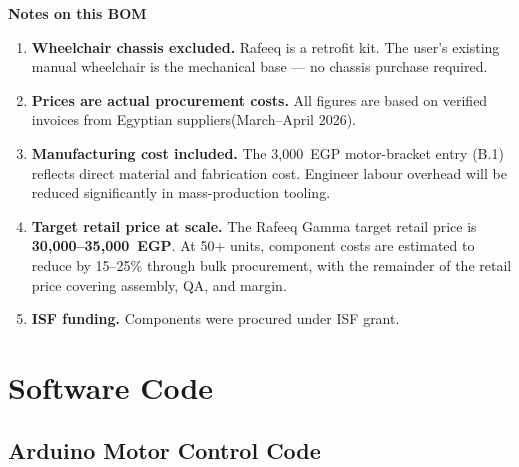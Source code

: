 \documentclass[12pt,a4paper]{report}
\begin{document}
\begin{mdframed}[
  backgroundcolor=NoteBg,
  linecolor=NoteFrame,
  linewidth=1.5pt,
  leftline=true,
  rightline=false,
  topline=false,
  bottomline=false,
  innerleftmargin=12pt,
  innerrightmargin=10pt,
  innertopmargin=8pt,
  innerbottommargin=8pt
]
{\bfseries\color{RafeeqBlue} Notes on this BOM}

\begin{enumerate}[leftmargin=*, itemsep=4pt, topsep=4pt]

  \item \textbf{Wheelchair chassis excluded.}
        Rafeeq is a retrofit kit. The user's existing manual
        wheelchair is the mechanical base — no chassis purchase
        required.

  \item \textbf{Prices are actual procurement costs.}
        All figures are based on verified invoices from Egyptian
        suppliers(March--April 2026).

  \item \textbf{Manufacturing cost included.}
        The 3{,}000~EGP motor-bracket entry (B.1) reflects
        direct material and fabrication cost. Engineer labour
        overhead will be reduced significantly in mass-production
        tooling.

  \item \textbf{Target retail price at scale.}
        The Rafeeq Gamma target retail price is
        \textbf{30{,}000--35{,}000~EGP}. At 50+ units,
        component costs are estimated to reduce by 15--25\%
        through bulk procurement, with the remainder of the
        retail price covering assembly, QA, and margin.

  \item \textbf{ISF funding.}
        Components were procured under ISF
        grant.

\end{enumerate}
\end{mdframed}
\chapter{Software Code}

\section{Arduino Motor Control Code}
\label{sec:arduino-code}
\end{document}

